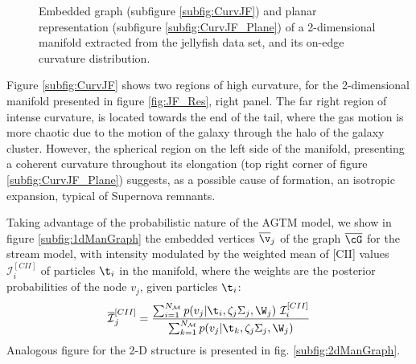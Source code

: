 \begin{figure}[h!]
\centering
{}
\caption{Embedded graph (subfigure \ref{subfig:CurvJF}) and planar representation (subfigure \ref{subfig:CurvJF_Plane}) of a 2-dimensional manifold extracted from the jellyfish data set, and its on-edge curvature distribution.}\label{fig:curvatureJF}
\end{figure}
Figure \ref{subfig:CurvJF} shows two regions of high curvature, for the 2-dimensional manifold presented in figure \ref{fig:JF_Res}, right panel. The far right region of intense curvature, is located towards the end of the tail, where the gas motion is more chaotic due to the motion of the galaxy through the halo of the galaxy cluster. However, the spherical region on the left side of the manifold, presenting a coherent curvature throughout its elongation (top right corner of figure \ref{subfig:CurvJF_Plane}) suggests, as a possible cause of formation, an isotropic expansion, typical of Supernova remnants. 

Taking advantage of the probabilistic nature of the AGTM model, we show in figure \ref{subfig:1dManGraph} the embedded vertices
$\overline{\v}_j$ of the graph $\overline{\cG}$
for the stream model, with intensity modulated by the weighted mean of [CII] values $\mathcal{I}^{[CII]}_i$ of particles $\t_i$ in the manifold, where the weights are the posterior probabilities of the node $v_j$, given  particles $\t_i$:
\begin{equation}\label{eq:WeightedVar}
    \overline{\mathcal{I}}^{[CII]}_j = \frac{\sum_{i=1}^{N_{\mathcal{M}}} p(v_j | \t_i,\zeta_j\Sigma_j,\W_j) ~ \mathcal{I}^{[CII]}_i}{\sum_{k=1}^{N_{\mathcal{M}}} p(v_j | \t_k,\zeta_j\Sigma_j,\W_j)}
\end{equation}
Analogous figure for the 2-D structure is presented in fig. \ref{subfig:2dManGraph}.

